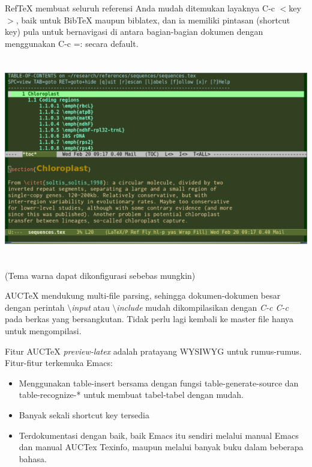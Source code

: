 \begin{enumerate}
RefTeX membuat seluruh referensi Anda mudah ditemukan layaknya C-c $<$key$>$, baik untuk BibTeX maupun biblatex, dan ia memiliki pintasan (shortcut key) pula untuk bernavigasi di antara bagian-bagian dokumen dengan menggunakan C-c =: secara default.


\includegraphics[width=15.64cm,height=8.83cm]{gambar/image3.jpg}

(Tema warna dapat dikonfigurasi sebebas mungkin)

AUCTeX mendukung multi-file parsing, sehingga dokumen-dokumen besar dengan perintah \textit{$\setminus$input} atau \textit{
$\setminus$include} mudah dikompilasikan dengan \textit{C-c C-c} pada berkas yang bersangkutan. Tidak perlu lagi kembali ke master file hanya untuk mengompilasi.
\par \vspace{12pt}
Fitur AUCTeX \textit{preview-latex} adalah pratayang WYSIWYG untuk rumus-rumus. Fitur-fitur terkemuka Emacs:

\begin{itemize}
\item Menggunakan table-insert bersama dengan fungsi
table-generate-source dan table-recognize-* untuk membuat tabel-tabel dengan mudah.
\item Banyak sekali shortcut key tersedia
\item Terdokumentasi dengan baik, baik Emacs itu sendiri melalui manual Emacs dan manual AUCTex Texinfo, maupun melalui banyak buku dalam beberapa bahasa.
\end{itemize}


\end{enumerate}
